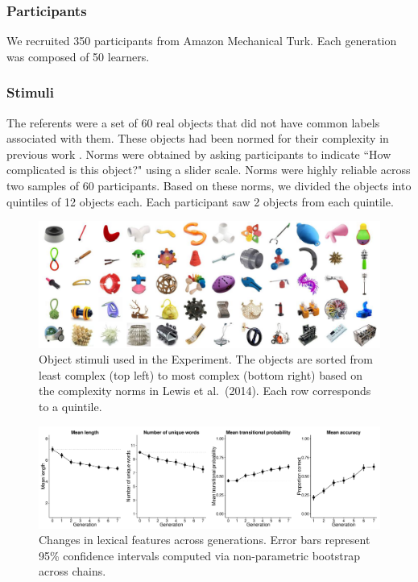 \subsubsection{Participants} 

We recruited 350 participants from Amazon Mechanical Turk. Each generation was composed of 50 learners.

\subsubsection{Stimuli}

The referents were a set of 60 real objects that did not have common labels associated with them. These objects had been normed for their complexity in previous work \cite[Figure\ 1]{lewisstructure2014}. Norms were obtained by asking participants to indicate ``How complicated is this object?" using a slider scale. Norms were highly reliable across two samples of 60 participants. Based on these norms, we divided the objects into quintiles of 12 objects each. Each participant saw 2 objects from each quintile. 

\begin{figure}[b!]
\begin{center}
\includegraphics[width = 1\linewidth]{figs/realobjs.pdf}
\end{center}
\vspace{-.24em}
\caption{Object stimuli used in the Experiment. The objects are sorted from least complex (top left) to most complex (bottom right) based on the complexity norms in Lewis et al.\ (2014). Each row corresponds to a quintile.}
\label{fig:objs}
\vspace{-1em}
\end{figure}


\begin{figure}[t]
\begin{center}
\includegraphics[scale = .3]{figs/Plot1.pdf}
\end{center}
\vspace{-.5em}
\caption{Changes in lexical features across generations. Error bars represent 95\% confidence intervals computed via non-parametric bootstrap across chains.}
\label{fig:length}
\vspace{-1em}
\end{figure}

